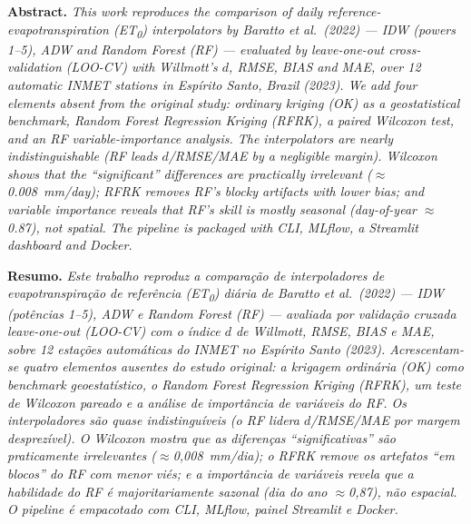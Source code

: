 \vspace{12pt}

\begin{sbcabstract}
\noindent\textbf{Abstract.}\textit{ This work reproduces the comparison of daily
reference-evapotranspiration (ET\textsubscript{0}) interpolators by Baratto et
al.\ (2022) --- IDW (powers 1--5), ADW and Random Forest (RF) --- evaluated by
leave-one-out cross-validation (LOO-CV) with Willmott's $d$, RMSE, BIAS and MAE,
over 12 automatic INMET stations in Espírito Santo, Brazil (2023). We add four
elements absent from the original study: ordinary kriging (OK) as a geostatistical
benchmark, Random Forest Regression Kriging (RFRK), a paired Wilcoxon test, and an
RF variable-importance analysis. The interpolators are nearly indistinguishable
(RF leads $d$/RMSE/MAE by a negligible margin). Wilcoxon shows that the
``significant'' differences are practically irrelevant ($\approx$0.008~mm/day);
RFRK removes RF's blocky artifacts with lower bias; and variable importance reveals
that RF's skill is mostly seasonal (day-of-year $\approx$0.87), not spatial. The
pipeline is packaged with CLI, MLflow, a Streamlit dashboard and Docker.}
\end{sbcabstract}

\begin{sbcabstract}
\noindent\textbf{Resumo.}\textit{ Este trabalho reproduz a comparação de
interpoladores de evapotranspiração de referência (ET\textsubscript{0}) diária de
Baratto et al.\ (2022) --- IDW (potências 1--5), ADW e Random Forest (RF) ---
avaliada por validação cruzada \emph{leave-one-out} (LOO-CV) com o índice $d$ de
Willmott, RMSE, BIAS e MAE, sobre 12 estações automáticas do INMET no Espírito
Santo (2023). Acrescentam-se quatro elementos ausentes do estudo original: a
krigagem ordinária (OK) como \emph{benchmark} geoestatístico, o \emph{Random
Forest Regression Kriging} (RFRK), um teste de Wilcoxon pareado e a análise de
importância de variáveis do RF. Os interpoladores são quase indistinguíveis (o RF
lidera $d$/RMSE/MAE por margem desprezível). O Wilcoxon mostra que as diferenças
``significativas'' são praticamente irrelevantes ($\approx$0,008~mm/dia); o RFRK
remove os artefatos ``em blocos'' do RF com menor viés; e a importância de
variáveis revela que a habilidade do RF é majoritariamente sazonal (dia do ano
$\approx$0,87), não espacial. O pipeline é empacotado com CLI, MLflow, painel
Streamlit e Docker.}
\end{sbcabstract}

